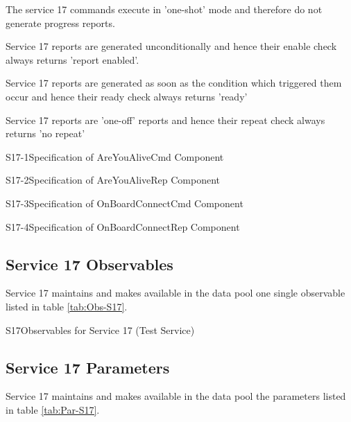 \documentclass[a4paper,10pt]{article}
\newenvironment{fw_itemize}						%
{\begin{itemize}
  \setlength{\itemsep}{1mm}
  \setlength{\parskip}{0pt}
  \setlength{\parsep}{0pt}}
{\end{itemize}}
\newenvironment{cr_cmd}[2]
{
\begin{longtable}{|p{3cm}|p{9.6cm}|}
\caption{#2} \label{tab:CR-#1} \\
\hline
\rowcolor{light-gray}
\DTLforeach*{dbCmd}{\att=Attribute,\attValue=#1}
{\DTLiffirstrow{}{\\\hline}\att & \attValue}\\\hline
}
{\end{longtable}}
\newenvironment{cr_rep}[2]
{
\begin{longtable}{|c|p{10cm}|}
\caption{#2} \label{tab:CR-#1}\\
\hline
\rowcolor{light-gray}
\DTLforeach*{dbRep}{\att=Attribute,\attValue=#1}
{\DTLiffirstrow{}{\\\hline}\att & \attValue}\\\hline
}
{\end{longtable}}
\newenvironment{cr_obs}[2]
{
\begin{longtable}{|l|p{9.5cm}|}
\caption{#2}\label{tab:Obs-#1} \\
\hline
\rowcolor{light-gray}
\textbf{Name} & \textbf{Description}\\
\hline\hline
\endfirsthead
\rowcolor{light-gray}
\textbf{Name} & \textbf{Description}\\
\hline\hline
\endhead
\DTLforeach*[\DTLiseq{\cat}{#1}]{dbObs}{\cat=Category,\name=Name,\desc=Desc}
{\DTLiffirstrow{}{\\\hline}\texttt{\name} & \desc}\\\hline
}
{\end{longtable}}
\begin{document}
\begin{fw_itemize}
\item The service 17 commands execute in 'one-shot' mode and therefore do not generate progress reports.
\item Service 17 reports are generated unconditionally and hence their enable check always returns 'report enabled'.
\item Service 17 reports are generated as soon as the condition which triggered them occur and hence their ready check always returns 'ready'
\item Service 17 reports are 'one-off' reports and hence their repeat check always returns 'no repeat'
\end{fw_itemize}

\newpage
\begin{cr_cmd}{S17-1}{Specification of AreYouAliveCmd Component}
\end{cr_cmd}

\begin{cr_rep}{S17-2}{Specification of AreYouAliveRep Component}
\end{cr_rep}

\newpage
\begin{cr_cmd}{S17-3}{Specification of OnBoardConnectCmd Component}
\end{cr_cmd}

\begin{cr_rep}{S17-4}{Specification of OnBoardConnectRep Component}
\end{cr_rep}



\subsection{Service 17 Observables}\label{sec:serv17Obs}
Service 17 maintains and makes available in the data pool one single observable listed in table \ref{tab:Obs-S17}.

\begin{cr_obs}{S17}{Observables for Service 17 (Test Service)}
\end{cr_obs}

\newpage
\subsection{Service 17 Parameters}\label{sec:serv17Par}
Service 17 maintains and makes available in the data pool the parameters listed in table \ref{tab:Par-S17}.
\end{document}
